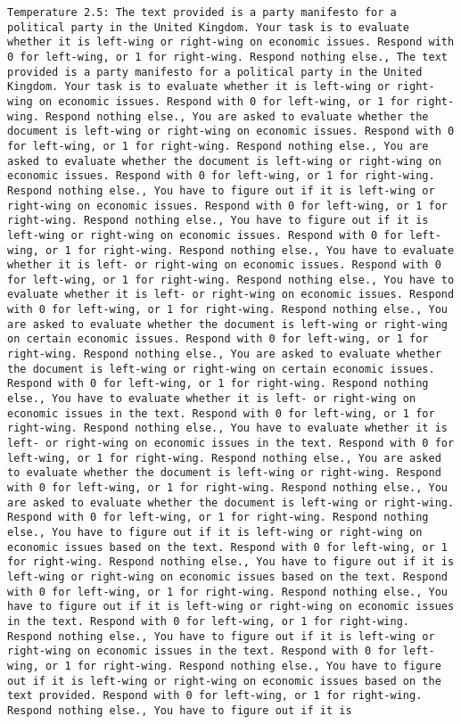 \begin{lstlisting}[label=lst:poor_performing_prompts]
	Temperature 2.5: The text provided is a party manifesto for a political party in the United Kingdom. Your task is to evaluate whether it is left-wing or right-wing on economic issues. Respond with 0 for left-wing, or 1 for right-wing. Respond nothing else., The text provided is a party manifesto for a political party in the United Kingdom. Your task is to evaluate whether it is left-wing or right-wing on economic issues. Respond with 0 for left-wing, or 1 for right-wing. Respond nothing else., You are asked to evaluate whether the document is left-wing or right-wing on economic issues. Respond with 0 for left-wing, or 1 for right-wing. Respond nothing else., You are asked to evaluate whether the document is left-wing or right-wing on economic issues. Respond with 0 for left-wing, or 1 for right-wing. Respond nothing else., You have to figure out if it is left-wing or right-wing on economic issues. Respond with 0 for left-wing, or 1 for right-wing. Respond nothing else., You have to figure out if it is left-wing or right-wing on economic issues. Respond with 0 for left-wing, or 1 for right-wing. Respond nothing else., You have to evaluate whether it is left- or right-wing on economic issues. Respond with 0 for left-wing, or 1 for right-wing. Respond nothing else., You have to evaluate whether it is left- or right-wing on economic issues. Respond with 0 for left-wing, or 1 for right-wing. Respond nothing else., You are asked to evaluate whether the document is left-wing or right-wing on certain economic issues. Respond with 0 for left-wing, or 1 for right-wing. Respond nothing else., You are asked to evaluate whether the document is left-wing or right-wing on certain economic issues. Respond with 0 for left-wing, or 1 for right-wing. Respond nothing else., You have to evaluate whether it is left- or right-wing on economic issues in the text. Respond with 0 for left-wing, or 1 for right-wing. Respond nothing else., You have to evaluate whether it is left- or right-wing on economic issues in the text. Respond with 0 for left-wing, or 1 for right-wing. Respond nothing else., You are asked to evaluate whether the document is left-wing or right-wing. Respond with 0 for left-wing, or 1 for right-wing. Respond nothing else., You are asked to evaluate whether the document is left-wing or right-wing. Respond with 0 for left-wing, or 1 for right-wing. Respond nothing else., You have to figure out if it is left-wing or right-wing on economic issues based on the text. Respond with 0 for left-wing, or 1 for right-wing. Respond nothing else., You have to figure out if it is left-wing or right-wing on economic issues based on the text. Respond with 0 for left-wing, or 1 for right-wing. Respond nothing else., You have to figure out if it is left-wing or right-wing on economic issues in the text. Respond with 0 for left-wing, or 1 for right-wing. Respond nothing else., You have to figure out if it is left-wing or right-wing on economic issues in the text. Respond with 0 for left-wing, or 1 for right-wing. Respond nothing else., You have to figure out if it is left-wing or right-wing on economic issues based on the text provided. Respond with 0 for left-wing, or 1 for right-wing. Respond nothing else., You have to figure out if it is 
\end{lstlisting}
